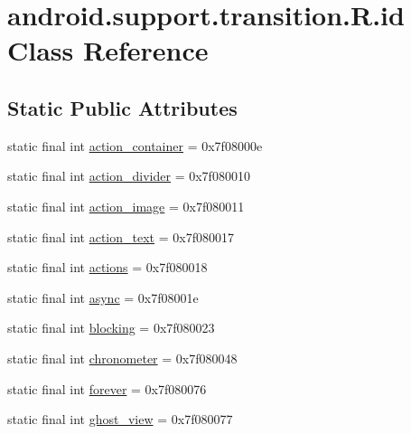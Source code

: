 \hypertarget{classandroid_1_1support_1_1transition_1_1_r_1_1id}{}\section{android.\+support.\+transition.\+R.\+id Class Reference}
\label{classandroid_1_1support_1_1transition_1_1_r_1_1id}
\subsection*{Static Public Attributes}
\begin{DoxyCompactItemize}
\item 
static final int \mbox{\hyperlink{classandroid_1_1support_1_1transition_1_1_r_1_1id_a5dee43fd7c62be47631539c1e8a4a24b}{action\+\_\+container}} = 0x7f08000e
\item 
static final int \mbox{\hyperlink{classandroid_1_1support_1_1transition_1_1_r_1_1id_afb68a5afbb8074cdc5c28afd9a807b62}{action\+\_\+divider}} = 0x7f080010
\item 
static final int \mbox{\hyperlink{classandroid_1_1support_1_1transition_1_1_r_1_1id_a5918eee8de93159a0a8b71c60b620c49}{action\+\_\+image}} = 0x7f080011
\item 
static final int \mbox{\hyperlink{classandroid_1_1support_1_1transition_1_1_r_1_1id_aa2be10087bc2139fb9c96446b83d821a}{action\+\_\+text}} = 0x7f080017
\item 
static final int \mbox{\hyperlink{classandroid_1_1support_1_1transition_1_1_r_1_1id_a551e16c7148efd1e8127d55b1629ace4}{actions}} = 0x7f080018
\item 
static final int \mbox{\hyperlink{classandroid_1_1support_1_1transition_1_1_r_1_1id_a8842bedcbb3950afaa62105e4940ef19}{async}} = 0x7f08001e
\item 
static final int \mbox{\hyperlink{classandroid_1_1support_1_1transition_1_1_r_1_1id_a56e206db702c5ae19ab7c4b70e533b6b}{blocking}} = 0x7f080023
\item 
static final int \mbox{\hyperlink{classandroid_1_1support_1_1transition_1_1_r_1_1id_a3e7496bac42210b89cd538b2f156066d}{chronometer}} = 0x7f080048
\item 
static final int \mbox{\hyperlink{classandroid_1_1support_1_1transition_1_1_r_1_1id_a38354973a8adcee1a8a56240acf674bb}{forever}} = 0x7f080076
\item 
static final int \mbox{\hyperlink{classandroid_1_1support_1_1transition_1_1_r_1_1id_a333cce399e723d86e6164069e17484aa}{ghost\+\_\+view}} = 0x7f080077

\end{DoxyCompactItemize}

